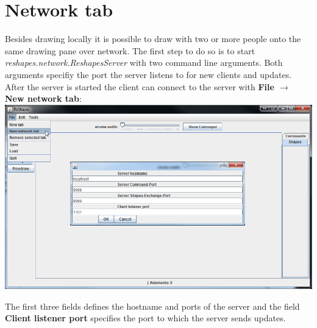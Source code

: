 \section{Network tab}

Besides drawing locally it is possible to draw with two or more people onto the same drawing pane over network.
The first step to do so is to start \textit{reshapes.network.ReshapesServer} with two command line arguments. 
Both arguments specifiy the port the server listens to for new clients and updates. \\
After the server is started the client can connect to the server with \textbf{File $\rightarrow$ New network tab}: \\
\includegraphics[width=1\textwidth]{img/new_network_tab}

The first three fields defines the hostname and ports of the server and the field \textbf{Client listener port} specifies the port to which the server sends updates.
